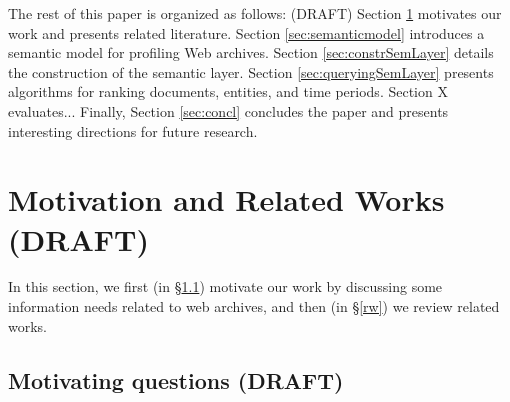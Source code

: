 \documentclass[runningheads,a4paper]{libtex/llncs}
\begin{document}
The rest of this paper is organized as follows: (DRAFT)
Section \ref{sec:motivAndRW} motivates our work and presents related literature.
Section \ref{sec:semanticmodel} introduces a semantic model for profiling Web archives.
Section \ref{sec:constrSemLayer} details the construction of the semantic layer.
Section \ref{sec:queryingSemLayer} presents algorithms for ranking documents, entities, and time periods.
Section X evaluates...
Finally, Section \ref{sec:concl} concludes the paper and presents interesting directions
for future research.


\section{Motivation and Related Works (DRAFT)}
\label{sec:motivAndRW}

In this section, we first (in \S \ref{motivation})
motivate our work by discussing some information needs related to web archives,
and then (in \S \ref{rw}) we review related works.

\subsection{Motivating questions (DRAFT)}
\label{motivation}
\end{document}
